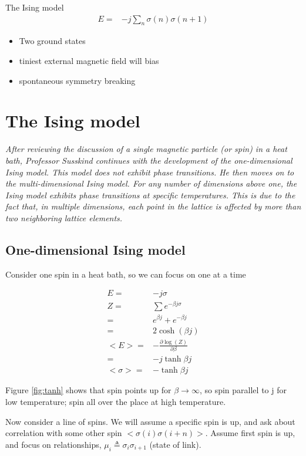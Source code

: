 \documentclass[]{article}
\begin{document}
The Ising model
\begin{align*}
E =& - j \sum_{n} \sigma(n) \sigma(n+1)
\end{align*}

\begin{itemize}
	\item Two ground states
	\item tiniest external magnetic field will bias
	\item spontaneous symmetry breaking
\end{itemize}
\section{The Ising model}

\textit{After reviewing the discussion of a single magnetic particle (or spin) in a heat bath, Professor Susskind continues with the development of the one-dimensional Ising model.  This model does not exhibit phase transitions.  He then moves on to the multi-dimensional Ising model.  For any number of dimensions above one, the Ising model exhibits phase transitions at specific temperatures.  This is due to the fact that, in multiple dimensions, each point in the lattice is affected by more than two neighboring lattice elements.}

\subsection{One-dimensional Ising model}

Consider one spin in a heat bath, so we can focus on one at a time

\begin{align*}
E =& -j \sigma\\
Z =& \sum e^{-\beta j \sigma}\\
=& e^{\beta j}+ e^{- \beta j}\\
=& 2 \cosh(\beta j)\\
\big<E\big> =& - \frac{\partial \log(Z)}{\partial \beta}\\
=& - j \tanh{\beta j}\\
\big<\sigma\big> =& - \tanh{\beta j}
\end{align*}

Figure \ref{fig:tanh} shows that spin points up for $\beta\rightarrow\infty$, so spin parallel to j for low temperature; spin all over the place at high temperature.

Now consider a line of spins. We will assume a specific spin is up, and ask about correlation with some other spin $\big<\sigma(i) \sigma(i+n)\big>$. Assume first spin is up, and focus on relationships, $\mu_i\triangleq\sigma_i\sigma_{i+1}$ (state of link).
\end{document}
